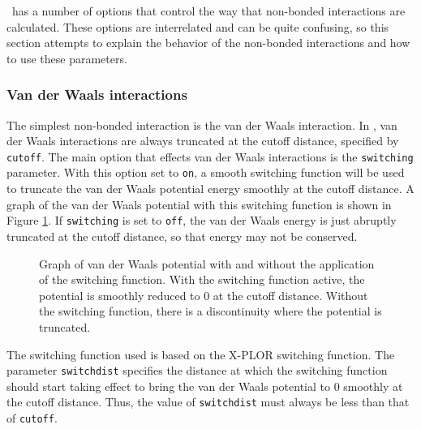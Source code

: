\NAMD\ has a number of options that control the way that non-bonded
interactions are calculated.  These options are interrelated and
can be quite confusing, so this section attempts to explain the
behavior of the non-bonded interactions and how to use these
parameters.

\subsubsection{Van der Waals interactions}
The simplest non-bonded 
interaction is the van der Waals interaction.  In 
\NAMD, van der Waals interactions are always truncated at the 
cutoff distance, specified by {\tt cutoff}.  
The main option that effects van der Waals interactions
is the {\tt switching} parameter.  With this option set to {\tt on},
a smooth switching function will be used to truncate the
van der Waals potential energy smoothly at the cutoff distance.  
A graph of the van der Waals 
potential with this switching function is shown in Figure 
\ref{fig:switching}.  If {\tt switching} is set to {\tt off}, the 
van der Waals energy is just abruptly truncated at the cutoff 
distance, so that energy may not be conserved.  

\begin{figure}[htb]
  \caption[Graph of van der Waals potential with and without switching]
  {\small Graph of van der Waals potential with and without the
  application of the switching function.  With the switching function
  active, the potential is smoothly reduced to 0 at the cutoff distance.
  Without the switching function, there is a discontinuity where the
  potential is truncated.}
  \label{fig:switching}
\end{figure}

The switching function used is based on the X-PLOR switching
function.  The parameter {\tt switchdist} specifies the distance
at which the switching function should start taking effect to
bring the van der Waals potential to 0 smoothly at the cutoff distance.  
Thus, the value of {\tt switchdist} must always be less than that 
of {\tt cutoff}.


